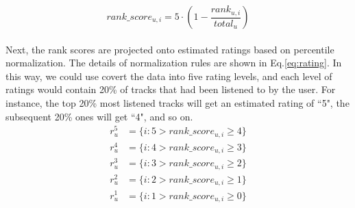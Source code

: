 \documentclass[a4paper,12pt]{report}
\begin{document}
\begin{equation}
    rank\_score_{u,i}= 5\cdot(1-\frac{rank_{u,i}}{total_u})
    \label{eq:score}
\end{equation}


\paragraph{}
Next, the rank scores are projected onto estimated ratings based on percentile normalization. The details of normalization rules are shown in Eq.\eqref{eq:rating}. In this way, we could use covert the data into five rating levels, and each level of ratings would contain 20\% of tracks that had been listened to by the user. For instance, the top 20\% most listened tracks will get an estimated rating of ``5", the subsequent 20\% ones will get ``4", and so on.
\begin{equation}
    \begin{aligned}
        r_{u}^5 &= \{i:5 > rank\_score_{u,i} \geq 4\}\\
        r_{u}^4 &= \{i:4 > rank\_score_{u,i} \geq 3\}\\
        r_{u}^3 &= \{i:3 > rank\_score_{u,i} \geq 2\}\\
        r_{u}^2 &= \{i:2 > rank\_score_{u,i} \geq 1\}\\
        r_{u}^1 &= \{i:1 > rank\_score_{u,i} \geq 0\}\\
    \end{aligned}
    \label{eq:rating}
\end{equation}
\end{document}
